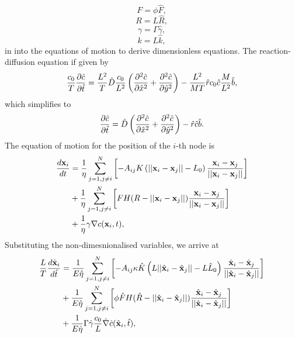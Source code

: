 \begin{equation*}
    F = \phi \hat{F},
\end{equation*}
\begin{equation*}
    R = L \hat{R},
\end{equation*}
\begin{equation*}
    \gamma = \Gamma \hat{\gamma},
\end{equation*}
\begin{equation*}
    k = L \hat{k},
\end{equation*}in
into the equations of motion to derive dimensionless equations. The reaction-diffusion equation 
if given by 
\begin{equation*}
    \frac{c_0}{T}\pdv{\hat{c}}{\hat{t}} = \frac{L^2}{T} \hat{D} \frac{c_0}{L^2} \left(\pdv[2]{\hat{c}}{\hat{x}} + \pdv[2]{\hat{c}}{\hat{y}} \right) -
     \frac{L^2}{M T} \hat{r} c_0 \hat{c} \frac{M}{L^2} \hat{b},
\end{equation*}
which simplifies to 
\begin{equation*}
    \pdv{\hat{c}}{\hat{t}} =  \hat{D} \left(\pdv[2]{\hat{c}}{\hat{x}} + \pdv[2]{\hat{c}}{\hat{y}} \right) -
      \hat{r} \hat{c} \hat{b}.
\end{equation*}
The equation of motion for the position of the $i$-th node is 
\begin{equation*}
\begin{split}
    \frac{d \vb{x}_i}{dt} &= 
    \frac{1}{ \eta}\sum_{j = 1, j \neq i}^N   \left[ - A_{ij} K\left( ||\vb{x}_i - \vb{x}_j|| - L_0\right) \frac{\vb{x}_i - \vb{x}_j}{||\vb{x}_i - \vb{x}_j||} \right]\\
     &+ \frac{1}{ \eta}\sum_{j = 1, j \neq i}^N \left[F H(R - ||\vb{x}_i - \vb{x}_j||) \frac{\vb{x}_i - \vb{x}_j}{||\vb{x}_i - \vb{x}_j||}     \right]\\ 
     &+ \frac{1}{\eta} \gamma \nabla c (\vb{x}_i, t),
\end{split}
\end{equation*}
Substituting the non-dimesnionalised variables, we arrive at
\begin{equation*}
    \begin{split}
        \frac{L}{T}\frac{d \hat{\vb{x}}_i}{d \hat{t}} &= 
        \frac{1}{E  \hat{\eta}}\sum_{j = 1, j \neq i}^N   \left[ - A_{ij} \kappa \hat{K}\left( L||\hat{\vb{x}}_i - \hat{\vb{x}}_j|| - L \hat{L}_0\right) \frac{\hat{\vb{x}}_i - \hat{\vb{x}}_j}{||\hat{\vb{x}}_i - \hat{\vb{x}}_j||} \right]\\
         &+ \frac{1}{E  \hat{\eta}}\sum_{j = 1, j \neq i}^N \left[\phi\hat{F} H(\hat{R} - ||\hat{\vb{x}}_i - \hat{\vb{x}}_j||) \frac{\hat{\vb{x}}_i - \hat{\vb{x}}_j}{||\hat{\vb{x}}_i - \hat{\vb{x}}_j||}     \right]\\ 
         &+ \frac{1}{E  \hat{\eta}}\Gamma \hat{\gamma} \frac{c_0}{L} \hat{\nabla}  \hat{c} (\hat{\vb{x}}_i, \hat{t}),
    \end{split}
\end{equation*}
